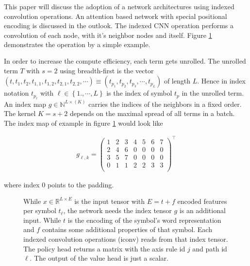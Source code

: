 \documentclass{scrartcl}
\theoremstyle{definition}
\begin{document}
This paper will discuss the adoption of a network architectures using indexed convolution operations.
An attention based network with special positional encoding is discussed in the outlook. 
The indexed CNN operation performs a convolution of each node, with it's neighbor nodes and itself.
Figure \ref{fig:index_tensor} demonstrates the operation by a simple example.

\begin{figure}[!htbp]
	\centering
	
	\label{fig:index_tensor}
\end{figure}

In order to increase the compute efficiency, each term gets unrolled.
The unrolled term $T$ with $s=2$ using breadth-first is the vector $\left( t, t_1, t_2, t_{1,1},t_{1,2}, t_{2,1}, t_{2,2}, \cdots \right) \equiv  \left( t_{p_1}, t_{p_2}, t_{p_3},\cdots, t_{p_L} \right)$ of length $L$.
Hence in index notation $t_{p_\ell}$ with $\ell \in \left\{1., \cdots,L\right\}$ is the index of symbol $t_p$ in the unrolled term.
An index map $g \in \mathbb{N}^{L\times \left(K\right)}$ carries the indices of the neighbors in a fixed order.
The kernel $K= s+2$ depends on the maximal spread of all terms in a batch.
The index map of example in figure \ref{fig:index_tensor} would look like

\begin{align}
	g_{\ell,k} = 
	\begin{pmatrix}
		1 & 2 & 3 & 4 & 5 & 6 & 7 \\
		2 & 4 & 6 & 0 & 0 & 0 & 0 \\
		3 & 5 & 7 & 0 & 0 & 0 & 0 \\
		0 & 1 & 1 & 2 & 2 & 3 & 3 \\
	\end{pmatrix}^\top
\end{align}

where index $0$ points to the padding.


\begin{figure}[!htbp]
	\centering
	
	\caption{While $x\in \mathbb{R}^{L\times E}$ is the input tensor with $E=t+f$ encoded features per symbol $t_\ell$, the network needs the index tensor $g$ is an additional input.
		While $t$ is the encoding of the symbol's word representation and $f$ contains some additional properties of that symbol.
		Each indexed convolution operations (iconv) reads from that index tensor.
		The policy head returns a matrix with the axis rule id $j$ and path id $\ell$. 
		The output of the value head is just a scalar. 
	}
	\label{fig:iconv_network}
\end{figure}
\end{document}
